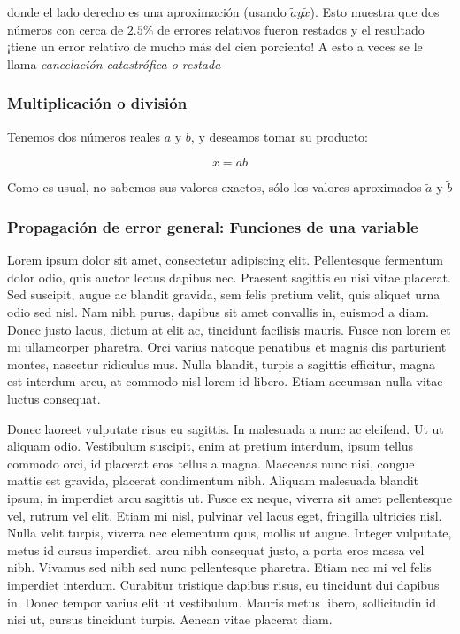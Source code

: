 \documentclass[11pt]{article}
\begin{document}
donde el lado derecho es una aproximación (usando
\(\tilde{a} y \tilde{x}\)). Esto muestra que dos números con cerca de
\(2.5\%\) de errores relativos fueron restados y el resultado ¡tiene un
error relativo de mucho más del cien porciento! A esto a veces se le
llama \emph{cancelación catastrófica o restada}

\hypertarget{multiplicaciuxf3n-o-divisiuxf3n}{%
\subsubsection{Multiplicación o
división}\label{multiplicaciuxf3n-o-divisiuxf3n}}

Tenemos dos números reales \(a\) y \(b\), y deseamos tomar su producto:

\[
\begin{equation}
x = ab \label{2.27}\tag{24}
\end{equation}
\]

Como es usual, no sabemos sus valores exactos, sólo los valores
aproximados \(\tilde{a}\) y \(\tilde{b}\)

\hypertarget{propagaciuxf3n-de-error-general-funciones-de-una-variable}{%
\subsubsection{Propagación de error general: Funciones de una
variable}\label{propagaciuxf3n-de-error-general-funciones-de-una-variable}}

Lorem ipsum dolor sit amet, consectetur adipiscing elit. Pellentesque
fermentum dolor odio, quis auctor lectus dapibus nec. Praesent sagittis
eu nisi vitae placerat. Sed suscipit, augue ac blandit gravida, sem
felis pretium velit, quis aliquet urna odio sed nisl. Nam nibh purus,
dapibus sit amet convallis in, euismod a diam. Donec justo lacus, dictum
at elit ac, tincidunt facilisis mauris. Fusce non lorem et mi
ullamcorper pharetra. Orci varius natoque penatibus et magnis dis
parturient montes, nascetur ridiculus mus. Nulla blandit, turpis a
sagittis efficitur, magna est interdum arcu, at commodo nisl lorem id
libero. Etiam accumsan nulla vitae luctus consequat.

Donec laoreet vulputate risus eu sagittis. In malesuada a nunc ac
eleifend. Ut ut aliquam odio. Vestibulum suscipit, enim at pretium
interdum, ipsum tellus commodo orci, id placerat eros tellus a magna.
Maecenas nunc nisi, congue mattis est gravida, placerat condimentum
nibh. Aliquam malesuada blandit ipsum, in imperdiet arcu sagittis ut.
Fusce ex neque, viverra sit amet pellentesque vel, rutrum vel elit.
Etiam mi nisl, pulvinar vel lacus eget, fringilla ultricies nisl. Nulla
velit turpis, viverra nec elementum quis, mollis ut augue. Integer
vulputate, metus id cursus imperdiet, arcu nibh consequat justo, a porta
eros massa vel nibh. Vivamus sed nibh sed nunc pellentesque pharetra.
Etiam nec mi vel felis imperdiet interdum. Curabitur tristique dapibus
risus, eu tincidunt dui dapibus in. Donec tempor varius elit ut
vestibulum. Mauris metus libero, sollicitudin id nisi ut, cursus
tincidunt turpis. Aenean vitae placerat diam.
\end{document}
